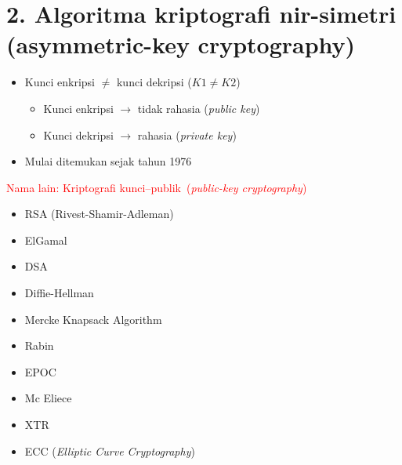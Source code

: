 \documentclass{article}
\begin{document}
\newpage


\section*{2. Algoritma kriptografi nir-simetri (asymmetric-key cryptography)}

\begin{itemize}
    \item Kunci enkripsi $\neq$ kunci dekripsi ($K1 \neq K2$)
    \begin{itemize}
        \item Kunci enkripsi $\rightarrow$ tidak rahasia (\textit{public key})
        \item Kunci dekripsi $\rightarrow$ rahasia (\textit{private key})
    \end{itemize}
    \item Mulai ditemukan sejak tahun 1976
\end{itemize}

\vspace{74.25mm}

\begin{flushright}
    \textcolor{red}{Nama lain: Kriptografi kunci--publik}\
    \textcolor{red}{(\textit{public-key cryptography})}
\end{flushright}

\vspace{20mm}

\begin{minipage}{0.45\textwidth}
    \begin{itemize}
        \item[--] RSA (Rivest-Shamir-Adleman)
        \item[--] ElGamal
        \item[--] DSA
        \item[--] Diffie-Hellman
        \item[--] Mercke Knapsack Algorithm
    \end{itemize}
\end{minipage}
\hfill
\begin{minipage}{0.45\textwidth}
    \begin{itemize}
        \item[--] Rabin
        \item[--] EPOC
        \item[--] Mc Eliece
        \item[--] XTR
        \item[--] ECC (\textit{Elliptic Curve Cryptography})
    \end{itemize}
\end{minipage}
\end{document}
